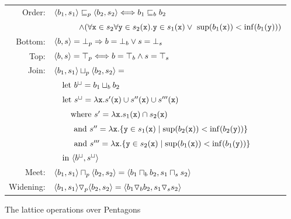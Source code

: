 \documentclass{elsart}
\begin{document}
\begin{figure}
\small
\begin{tabular}{rl}
Order:& $\langle b_1, s_1 \rangle \sqsubseteq_p \langle b_2, s_2 \rangle   \Longleftrightarrow  b_1 \sqsubseteq_b b_2 $ \\
& $ \qquad \quad \wedge (\forall \mathtt{x} \in s_2 \forall\mathtt{y} \in s_2(\mathtt{x}). \mathtt{y} \in s_1(\mathtt{x}) \vee\ \mathrm{sup}(b_1(\mathtt{x})) < \mathrm{inf}(b_1(\mathtt{y}))) $ \\
Bottom:& $\langle b, s \rangle  = {\bot}_p \Rightarrow b = {\bot}_b \vee  s = {\bot}_s $ \\
Top:& $ \langle b, s \rangle = {\top}_p \Longleftrightarrow b = {\top}_b \wedge s = {\top}_s $\\
Join:& $\langle b_1, s_1 \rangle  \sqcup_p  \langle b_2, s_2 \rangle  = $ \\
& $\quad \mathrm{let}\ b^\sqcup = b_1 \sqcup_b b_2$ \\
& $\quad \mathrm{let}\ s^\sqcup = \lambda \mathtt{x}.  s'(\mathtt{x}) \cup s''(\mathtt{x}) \cup s'''(\mathtt{x})$ \\
& $\quad \quad \mathrm{where}\ s' = \lambda \mathtt{x}. s_1(\mathtt{x}) \cap s_2(\mathtt{x})$ \\
& $\quad \phantom{\lambda \code{x}.} \mathrm{and}\ s'' = \lambda \code{x}. \{\code{y} \in s_1(\code{x}) \mid \mathrm{sup}(b_2(\code{x})) < \mathrm{inf}(b_2(\code{y})) \}$ \\
& $\quad  \phantom{\lambda \code{x}.} \mathrm{and}\ s''' =  \lambda \code{x}. \{\code{y} \in s_2(\code{x}) \mid \mathrm{sup}(b_1(\code{x})) < \mathrm{inf}(b_1(\code{y})) \}$ \\
& $\quad \mathrm{in}\ \langle  b^\sqcup, s^\sqcup \rangle$ \\
Meet:& $ \langle b_1, s_1 \rangle  \sqcap_p  \langle b_2, s_2 \rangle  = \langle b_1 \sqcap_b b_2, s_1 \sqcap_s s_2 \rangle $  \\
Widening:&  $ \langle b_1, s_1 \rangle  \triangledown_p \langle b_2, s_2 \rangle  = \langle b_1 \triangledown_b b_2, s_1 \triangledown_s s_2 \rangle$
\end{tabular}
\caption{The lattice operations over Pentagons}
\label{tab:pentagons}
\end{figure} 
\end{document}
